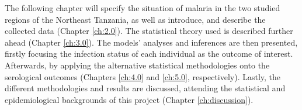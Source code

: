 The following chapter will specify the situation of malaria in the two studied regions of the Northeast Tanzania, as well as introduce, and describe the collected data (Chapter \ref{ch:2.0}).
The statistical theory used is described further ahead (Chapter \ref{ch:3.0}).
The models' analyses and inferences are then presented, firstly focusing the infection status of each individual as the outcome of interest.
Afterwards, by applying the alternative statistical methodologies onto the serological outcomes (Chapters \ref{ch:4.0} and \ref{ch:5.0}, respectively).
Lastly, the different methodologies and results are discussed, attending the statistical and epidemiological backgrounds of this project (Chapter \ref{ch:discussion}).